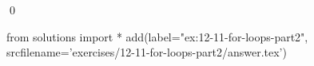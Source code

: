 
\begin{ex}
  \label{ex:12-11-for-loops-part2}
  
  \qed
\end{ex}
\begin{python0}
from solutions import *
add(label="ex:12-11-for-loops-part2",
    srcfilename='exercises/12-11-for-loops-part2/answer.tex')
\end{python0}
